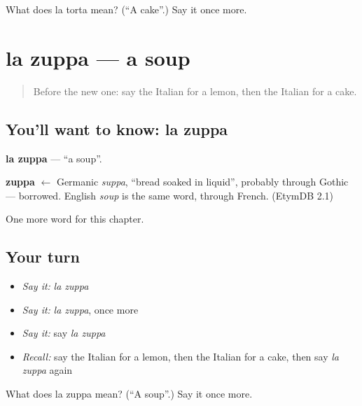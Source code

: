 \begin{tcolorbox}[breakable,colback=teal!4,colframe=teal!35!black,title={Before you move on}]
What does la torta mean? (\textquotedblleft{}A cake\textquotedblright{}.) Say it once more.
\end{tcolorbox}
\section[la zuppa]{la zuppa — a soup}

\label{lesson:IT-C54-zuppa}



\begin{quote}
Before the new one: say the Italian for a lemon, then the Italian for a cake.
\end{quote}

\subsection*{You'll want to know: la zuppa}
\textbf{la zuppa} — \textquotedblleft{}a soup\textquotedblright{}.

\begin{cousinweb}
\textbf{zuppa} $\leftarrow$ Germanic \emph{suppa}, \textquotedblleft{}bread soaked in liquid\textquotedblright{}, probably through Gothic — borrowed. English \emph{soup} is the same word, through French. (EtymDB 2.1)
\end{cousinweb}

\begin{grammarlens}[title={What you've built}]
One more word for this chapter.
\end{grammarlens}

\subsection*{Your turn}
\begin{itemize}
\raggedright
  \item \emph{Say it:} \emph{la zuppa}
  \item \emph{Say it:} \emph{la zuppa}, once more
  \item \emph{Say it:} say \emph{la zuppa}
  \item \emph{Recall:} say the Italian for a lemon, then the Italian for a cake, then say \emph{la zuppa} again
\end{itemize}

\begin{tcolorbox}[breakable,colback=teal!4,colframe=teal!35!black,title={Before you move on}]
What does la zuppa mean? (\textquotedblleft{}A soup\textquotedblright{}.) Say it once more.
\end{tcolorbox}
